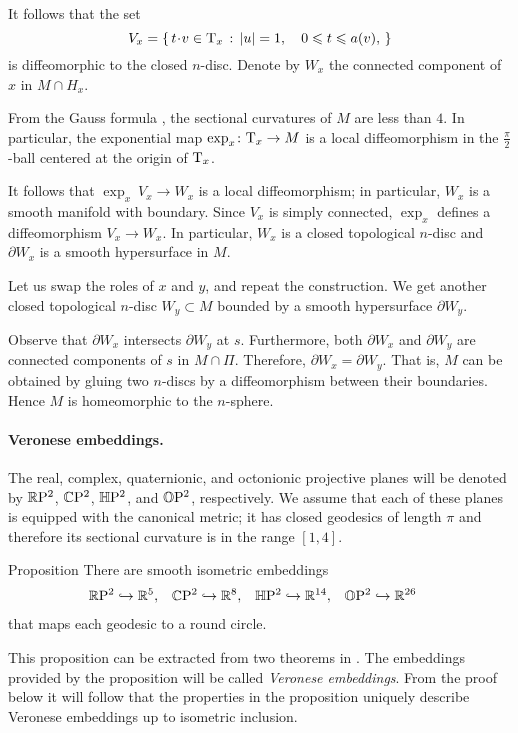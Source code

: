 \documentclass[a4paper,10pt]{article}
\begin{document}
It follows that the set 
\[V_x=\set{t\cdot v\in \T_x}{|u|=1,\quad 0\le t\le a(v),}\]
is diffeomorphic to the closed $n$-disc.
Denote by $W_x$ the connected component of $x$ in $M\cap H_x$.

From the Gauss formula \cite[Lemma 5]{petrunin2024}, the sectional curvatures of $M$ are less than $4$.
In particular, the exponential map $\exp_x\colon\mathrm{T}_x\to M$ is a local diffeomorphism in the $\tfrac\pi2$-ball centered at the origin of $\mathrm{T}_x$.

It follows that $\exp_x\:V_x\to W_x$ is a local diffeomorphism;
in particular, $W_x$ is a smooth manifold with boundary.
Since $V_x$ is simply connected, $\exp_x$ defines a diffeomorphism $V_x\to W_x$.
In particular, $W_x$ is a closed topological $n$-disc and $\partial W_x$ is a smooth hypersurface in $M$.

Let us swap the roles of $x$ and $y$, and repeat the construction.
We get another closed topological $n$-disc $W_y\subset M$ bounded by a smooth hypersurface $\partial W_y$.

Observe that $\partial W_x$ intersects $\partial W_y$ at $s$.
Furthermore, both $\partial W_x$ and $\partial W_y$ are connected components of $s$ in $M\cap \Pi$.
Therefore, $\partial W_x=\partial W_y$.
That is, $M$ can be obtained by gluing two $n$-discs by a diffeomorphism between their boundaries.
Hence $M$ is homeomorphic to the $n$-sphere.
\qeds

\paragraph{Veronese embeddings.}\label{thm:=}
The real, complex, quaternionic, and octonionic projective planes will be denoted by
$\mathbb{R}\mathrm{P}^2$, $\mathbb{C}\mathrm{P}^2$, $\mathbb{H}\mathrm{P}^2$, and $\mathbb{O}\mathrm{P}^2$, respectively.
We assume that each of these planes is equipped with the canonical metric;
it has closed geodesics of length $\pi$ and therefore its sectional curvature is in the range $[1,4]$.

\begin{thm}{Proposition}
There are smooth isometric embeddings
\begin{align*}
\mathbb{R}\mathrm{P}^2& \hookrightarrow\mathbb{R}^5 , 
&
\mathbb{C}\mathrm{P}^2& \hookrightarrow\mathbb{R}^8,
&
\mathbb{H}\mathrm{P}^2& \hookrightarrow\mathbb{R}^{14}, 
&
\mathbb{O}\mathrm{P}^2& \hookrightarrow\mathbb{R}^{26}
\end{align*}
that maps each geodesic to a round circle. 
\end{thm}

This proposition can be extracted from two theorems in \cite[§ 2]{sakamoto}.
The embeddings provided by the proposition will be called \emph{Veronese embeddings}.
From the proof below it will follow that the properties in the proposition uniquely describe
Veronese embeddings up to isometric inclusion.
\end{document}
